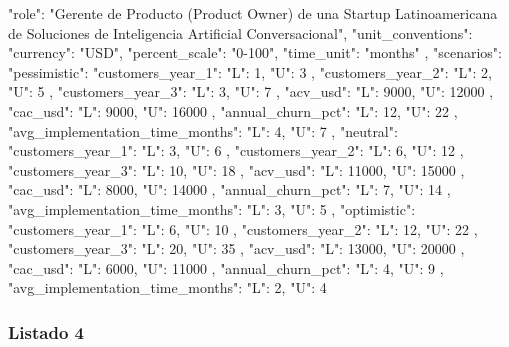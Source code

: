 \begin{APACode}
{
  "role": "Gerente de Producto (Product Owner) de una Startup Latinoamericana de Soluciones de Inteligencia Artificial Conversacional",
  "unit_conventions": {
    "currency": "USD",
    "percent_scale": "0-100",
    "time_unit": "months"
  },
  "scenarios": {
    "pessimistic": {
      "customers_year_1": {
        "L": 1,
        "U": 3
      },
      "customers_year_2": {
        "L": 2,
        "U": 5
      },
      "customers_year_3": {
        "L": 3,
        "U": 7
      },
      "acv_usd": {
        "L": 9000,
        "U": 12000
      },
      "cac_usd": {
        "L": 9000,
        "U": 16000
      },
      "annual_churn_pct": {
        "L": 12,
        "U": 22
      },
      "avg_implementation_time_months": {
        "L": 4,
        "U": 7
      }
    },
    "neutral": {
      "customers_year_1": {
        "L": 3,
        "U": 6
      },
      "customers_year_2": {
        "L": 6,
        "U": 12
      },
      "customers_year_3": {
        "L": 10,
        "U": 18
      },
      "acv_usd": {
        "L": 11000,
        "U": 15000
      },
      "cac_usd": {
        "L": 8000,
        "U": 14000
      },
      "annual_churn_pct": {
        "L": 7,
        "U": 14
      },
      "avg_implementation_time_months": {
        "L": 3,
        "U": 5
      }
    },
    "optimistic": {
      "customers_year_1": {
        "L": 6,
        "U": 10
      },
      "customers_year_2": {
        "L": 12,
        "U": 22
      },
      "customers_year_3": {
        "L": 20,
        "U": 35
      },
      "acv_usd": {
        "L": 13000,
        "U": 20000
      },
      "cac_usd": {
        "L": 6000,
        "U": 11000
      },
      "annual_churn_pct": {
        "L": 4,
        "U": 9
      },
      "avg_implementation_time_months": {
        "L": 2,
        "U": 4
      }
    }
  }
}
\end{APACode}

\subsubsection{Listado 4}
\label{anexo:code-6-3-2-4}

